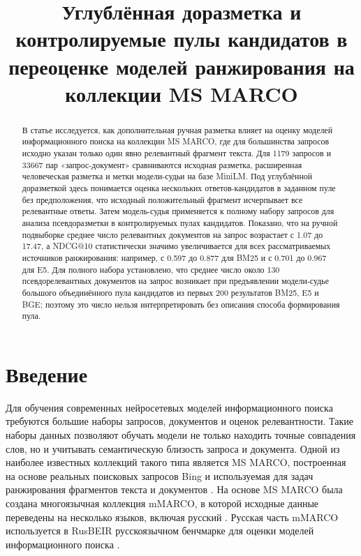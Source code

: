 \documentclass[runningheads,a4paper]{llncs}
\title{Углублённая доразметка и контролируемые пулы кандидатов в переоценке моделей ранжирования на коллекции MS MARCO}
\author{}
\institute{}
\begin{document}
\maketitle
\begin{abstract}
В статье исследуется, как дополнительная ручная разметка влияет на оценку моделей информационного поиска на коллекции MS MARCO, где для большинства запросов исходно указан только один явно релевантный фрагмент текста. Для 1179 запросов и 33667 пар «запрос-документ» сравниваются исходная разметка, расширенная человеческая разметка и метки модели-судьи на базе MiniLM. Под углублённой доразметкой здесь понимается оценка нескольких ответов-кандидатов в заданном пуле без предположения, что исходный положительный фрагмент исчерпывает все релевантные ответы. Затем модель-судья применяется к полному набору запросов для анализа псевдоразметки в контролируемых пулах кандидатов. Показано, что на ручной подвыборке среднее число релевантных документов на запрос возрастает с 1.07 до 17.47, а NDCG@10 статистически значимо увеличивается для всех рассматриваемых источников ранжирования: например, с 0.597 до 0.877 для BM25 и с 0.701 до 0.967 для E5. Для полного набора установлено, что среднее число около 130 псевдорелевантных документов на запрос возникает при предъявлении модели-судье большого объединённого пула кандидатов из первых 200 результатов BM25, E5 и BGE; поэтому это число нельзя интерпретировать без описания способа формирования пула.

\end{abstract}

\section{Введение}

Для обучения современных нейросетевых моделей информационного поиска требуются большие наборы запросов, документов и оценок релевантности. Такие наборы данных позволяют обучать модели не только находить точные совпадения слов, но и учитывать семантическую близость запроса и документа. Одной из наиболее известных коллекций такого типа является MS MARCO, построенная на основе реальных поисковых запросов Bing и используемая для задач ранжирования фрагментов текста и документов \cite{bajaj2016msmarco}. На основе MS MARCO была создана многоязычная коллекция mMARCO, в которой исходные данные переведены на несколько языков, включая русский \cite{bonifacio2022mmarco}. Русская часть mMARCO используется в RusBEIR \textemdash{} русскоязычном бенчмарке для оценки моделей информационного поиска \cite{2025rusbeir}.
\end{document}
